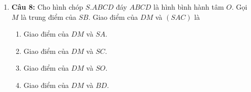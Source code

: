 \documentclass[12pt,a4paper]{extarticle}
\begin{document}
\begin{enumerate}
\begin{multicols}{2}
\begin{enumerate}
            \item $OM$.
            \item $MN$.
            \item $A,B$ đều đúng.
            \item $A,B$ đều sai.
        \end{enumerate}
    \end{multicols}
    \item \textbf{Câu 8:} Cho hình chóp $S.ABCD$ đáy $ABCD$ là hình bình hành tâm $O$. Gọi $M$ là trung điểm của $SB$. Giao điểm của $DM$ và $(SAC)$ là
    \begin{enumerate}
        \item Giao điểm của $DM$ và $SA$.
        \item Giao điểm của $DM$ và $SC$.
        \item Giao điểm của $DM$ và $SO$.
        \item Giao điểm của $DM$ và $BD$.
    \end{enumerate}
\end{enumerate}
\end{document}
